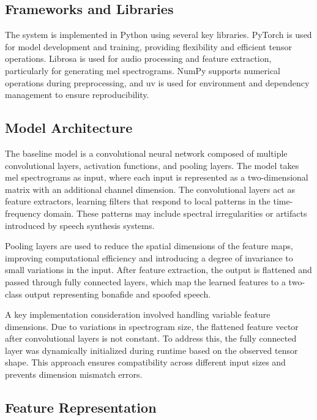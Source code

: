 \documentclass[conference]{IEEEtran}
\begin{document}
\subsection{Frameworks and Libraries}

The system is implemented in Python using several key
libraries. PyTorch is used for model development and training,
providing flexibility and efficient tensor operations. Librosa is
used for audio processing and feature extraction, particularly
for generating mel spectrograms. NumPy supports numerical
operations during preprocessing, and uv is used for environment
and dependency management to ensure reproducibility.

\subsection{Model Architecture}

The baseline model is a convolutional neural network composed
of multiple convolutional layers, activation functions,
and pooling layers. The model takes mel spectrograms as input,
where each input is represented as a two-dimensional matrix
with an additional channel dimension. The convolutional layers act as feature extractors, learning filters that respond to
local patterns in the time-frequency domain. These patterns
may include spectral irregularities or artifacts introduced by
speech synthesis systems.

Pooling layers are used to reduce the spatial dimensions
of the feature maps, improving computational efficiency and
introducing a degree of invariance to small variations in
the input. After feature extraction, the output is flattened
and passed through fully connected layers, which map the
learned features to a two-class output representing bonafide
and spoofed speech.

A key implementation consideration involved handling variable
feature dimensions. Due to variations in spectrogram size,
the flattened feature vector after convolutional layers is not
constant. To address this, the fully connected layer was dynamically
initialized during runtime based on the observed tensor
shape. This approach ensures compatibility across different
input sizes and prevents dimension mismatch errors.

\subsection{Feature Representation}
\end{document}
